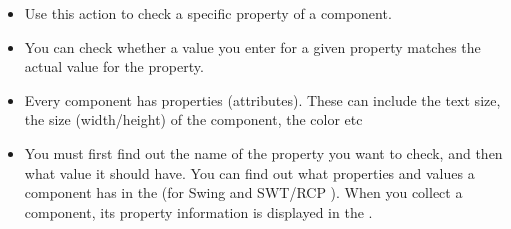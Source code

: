 \begin{itemize}
\item Use this action to check a specific property of a component. 
\item You can check whether a value you enter for a given property matches the actual value for the property.
\item Every component has properties (attributes). These can include the text size, the size (width/height) of the component, the color etc
\item You must first find out the name of the property you want to check, and then what value it should have. You can find out what properties and values a component has in the \gdomm{} (for Swing and SWT/RCP \gdauts{}). When you collect a component, its property information is displayed in the \gdpropview{}. 
\end{itemize}

